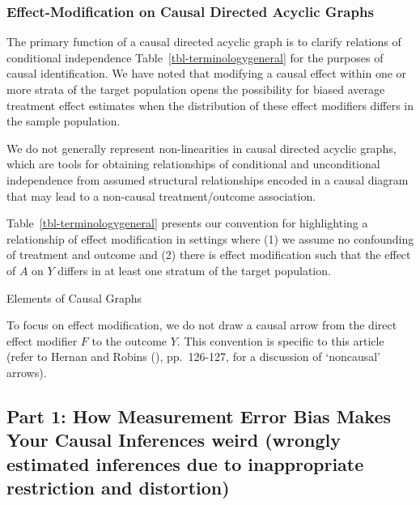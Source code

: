 \documentclass[
  single column]{article}
\begin{document}
\subsubsection{Effect-Modification on Causal Directed Acyclic
Graphs}\label{effect-modification-on-causal-directed-acyclic-graphs}

The primary function of a causal directed acyclic graph is to clarify
relations of conditional independence Table~\ref{tbl-terminologygeneral}
for the purposes of causal identification. We have noted that modifying
a causal effect within one or more strata of the target population opens
the possibility for biased average treatment effect estimates when the
distribution of these effect modifiers differs in the sample population.

We do not generally represent non-linearities in causal directed acyclic
graphs, which are tools for obtaining relationships of conditional and
unconditional independence from assumed structural relationships encoded
in a causal diagram that may lead to a non-causal treatment/outcome
association.

Table~\ref{tbl-terminologygeneral} presents our convention for
highlighting a relationship of effect modification in settings where (1)
we assume no confounding of treatment and outcome and (2) there is
effect modification such that the effect of \(A\) on \(Y\) differs in at
least one stratum of the target population.

\begin{table}

\caption{\label{tbl-terminologygeneral}Elements of Causal Graphs}

\centering{

\terminologyeffectmodification

}

\end{table}%

To focus on effect modification, we do not draw a causal arrow from the
direct effect modifier \(F\) to the outcome \(Y\). This convention is
specific to this article (refer to Hernan and Robins
(), pp.~126-127, for a discussion
of `noncausal' arrows).

\subsection{\texorpdfstring{Part 1: How Measurement Error Bias Makes
Your Causal Inferences \textbf{weird} (\textbf{w}rongly
\textbf{e}stimated inferences due to \textbf{i}nappropriate
\textbf{r}estriction and
\textbf{d}istortion)}{Part 1: How Measurement Error Bias Makes Your Causal Inferences weird (wrongly estimated inferences due to inappropriate restriction and distortion)}}\label{id-sec-1}
\end{document}
